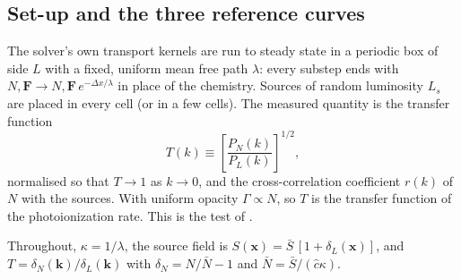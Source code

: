 \documentclass[11pt]{article}
\newcommand{\chat}{\hat{c}}
\newcommand{\dx}{\Delta x}
\begin{document}
\subsection{Set-up and the three reference curves}

The solver's own transport kernels are run to steady state in a periodic box of side $L$ with a fixed,
uniform mean free path $\lambda$: every substep ends with $N,\mathbf F\to N,\mathbf F\,e^{-\dx/\lambda}$ in place of the
chemistry. Sources of random luminosity $L_s$ are placed in every cell (or in a few cells). The measured
quantity is the transfer function
\begin{equation}
T(k)\equiv\left[\frac{P_N(k)}{P_L(k)}\right]^{1/2},
\end{equation}
normalised so that $T\to1$ as $k\to0$, and the cross-correlation coefficient $r(k)$ of $N$ with the
sources. With uniform opacity $\Gamma\propto N$, so $T$ is the transfer function of the photoionization
rate. This is the test of \citet{gnedin25}.

Throughout, $\kappa=1/\lambda$, the source field is $S(\mathbf x)=\bar S\,[1+\delta_L(\mathbf x)]$, and
$T=\delta_N(\mathbf k)/\delta_L(\mathbf k)$ with $\delta_N=N/\bar N-1$ and $\bar N=\bar S/(\chat\kappa)$.
\end{document}
